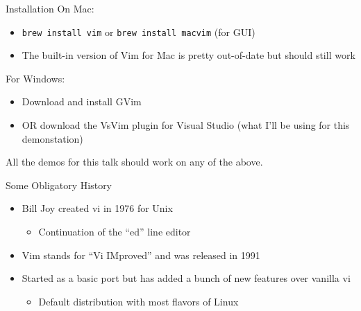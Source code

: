 \documentclass{beamer}
\begin{document}
\begin{frame} {Installation}
	On Mac: \begin{itemize}
		\item \texttt{brew install vim} or \texttt{brew install macvim} (for GUI)
		\item The built-in version of Vim for Mac is pretty out-of-date but should still work
                \end{itemize}
	For Windows: \begin{itemize}
		\item Download and install GVim
		\item OR download the VsVim plugin for Visual Studio (what I'll be using for this demonstation)
	\end{itemize}

	All the demos for this talk should work on any of the above.  
\end{frame}
\begin{frame}{Some Obligatory History}
  \begin{itemize}
	  \item Bill Joy created vi in 1976 for Unix \begin{itemize}
			  \item Continuation of the ``ed'' line editor
	  \end{itemize}
          \item Vim stands for ``Vi IMproved'' and was released in 1991
	  \item Started as a basic port but has added a bunch of new features over vanilla vi \begin{itemize}
			\item Default distribution with most flavors of Linux
	  \end{itemize}
		  
          
  \end{itemize}
\end{frame}
\end{document}
